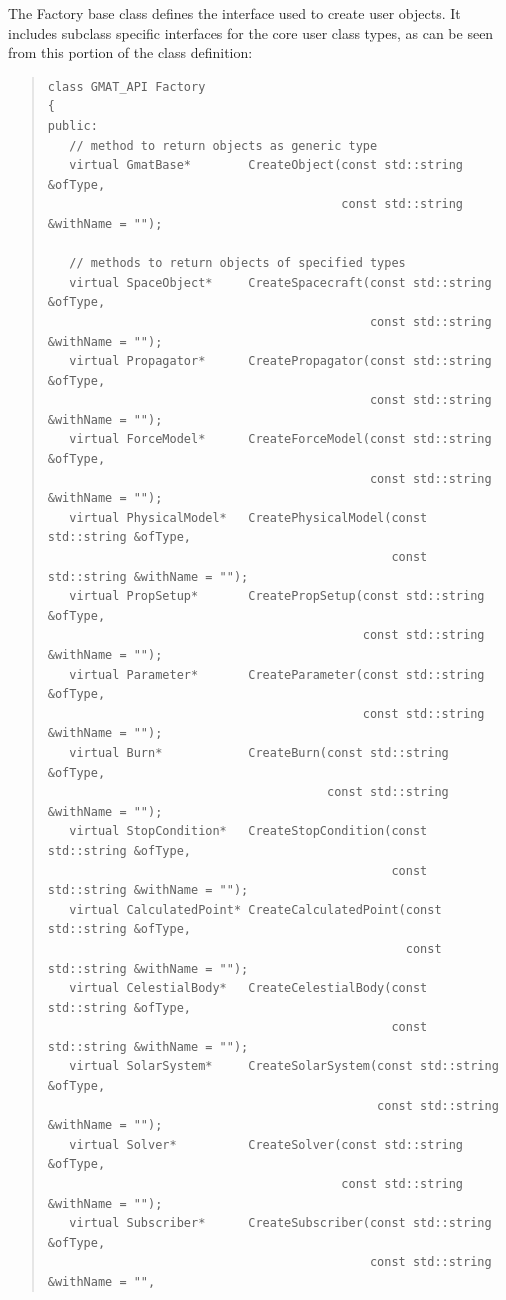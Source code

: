 \documentclass[letterpaper,10pt]{article}
\begin{document}
The Factory base class defines the interface used to create user objects.  It includes subclass
specific interfaces for the core user class types, as can be seen from this portion of the class
definition:
\begin{quote}
\begin{small}
\begin{verbatim}
class GMAT_API Factory
{
public:
   // method to return objects as generic type
   virtual GmatBase*        CreateObject(const std::string &ofType,
                                         const std::string &withName = "");

   // methods to return objects of specified types
   virtual SpaceObject*     CreateSpacecraft(const std::string &ofType,
                                             const std::string &withName = "");
   virtual Propagator*      CreatePropagator(const std::string &ofType,
                                             const std::string &withName = "");
   virtual ForceModel*      CreateForceModel(const std::string &ofType,
                                             const std::string &withName = "");
   virtual PhysicalModel*   CreatePhysicalModel(const std::string &ofType,
                                                const std::string &withName = "");
   virtual PropSetup*       CreatePropSetup(const std::string &ofType,
                                            const std::string &withName = "");
   virtual Parameter*       CreateParameter(const std::string &ofType,
                                            const std::string &withName = "");
   virtual Burn*            CreateBurn(const std::string &ofType,
                                       const std::string &withName = "");
   virtual StopCondition*   CreateStopCondition(const std::string &ofType,
                                                const std::string &withName = "");
   virtual CalculatedPoint* CreateCalculatedPoint(const std::string &ofType,
                                                  const std::string &withName = "");
   virtual CelestialBody*   CreateCelestialBody(const std::string &ofType,
                                                const std::string &withName = "");
   virtual SolarSystem*     CreateSolarSystem(const std::string &ofType,
                                              const std::string &withName = "");
   virtual Solver*          CreateSolver(const std::string &ofType,
                                         const std::string &withName = "");
   virtual Subscriber*      CreateSubscriber(const std::string &ofType,
                                             const std::string &withName = "",

\end{verbatim}
\end{small}
\end{quote}
\end{document}
